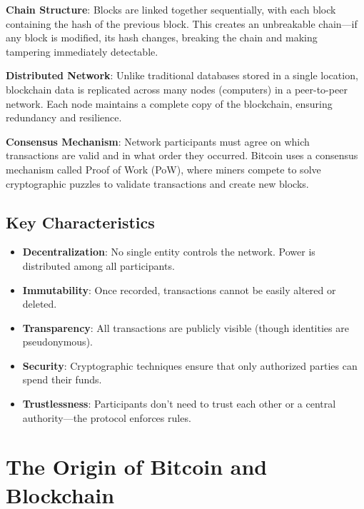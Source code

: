 \textbf{Chain Structure}: Blocks are linked together sequentially, with each block containing the hash of the previous block. This creates an unbreakable chain---if any block is modified, its hash changes, breaking the chain and making tampering immediately detectable.

\textbf{Distributed Network}: Unlike traditional databases stored in a single location, blockchain data is replicated across many nodes (computers) in a peer-to-peer network. Each node maintains a complete copy of the blockchain, ensuring redundancy and resilience.

\textbf{Consensus Mechanism}: Network participants must agree on which transactions are valid and in what order they occurred. Bitcoin uses a consensus mechanism called Proof of Work (PoW), where miners compete to solve cryptographic puzzles to validate transactions and create new blocks.

\subsection{Key Characteristics}
\label{subsec:key-characteristics}

\begin{itemize}
  \item \textbf{Decentralization}: No single entity controls the network. Power is distributed among all participants.
  \item \textbf{Immutability}: Once recorded, transactions cannot be easily altered or deleted.
  \item \textbf{Transparency}: All transactions are publicly visible (though identities are pseudonymous).
  \item \textbf{Security}: Cryptographic techniques ensure that only authorized parties can spend their funds.
  \item \textbf{Trustlessness}: Participants don't need to trust each other or a central authority---the protocol enforces rules.
\end{itemize}

\section{The Origin of Bitcoin and Blockchain}
\label{sec:origin-bitcoin-blockchain}

